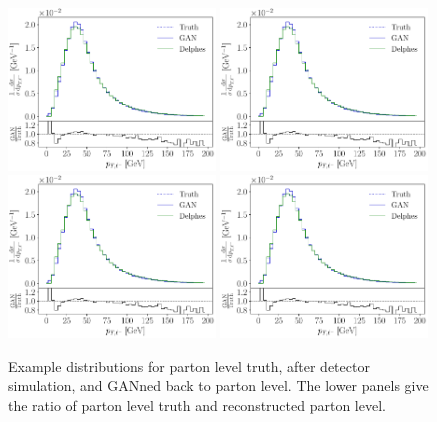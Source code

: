 \begin{figure}[t]
\centering
\includegraphics[page = 2, width=0.49\textwidth]{figures/cGAN/GAN_ratio}
\includegraphics[page = 3, width=0.49\textwidth]{figures/cGAN/GAN_ratio} \\
\includegraphics[page = 1, width=0.49\textwidth]{figures/cGAN/GAN_ratio}
\includegraphics[page = 4, width=0.49\textwidth]{figures/cGAN/GAN_ratio}
\caption{Example distributions for parton level truth, after
  detector simulation, and GANned back to parton level. The lower
  panels give the ratio of parton level truth and
  reconstructed parton level.}
\label{fig:distributions_GAN}
\end{figure}

